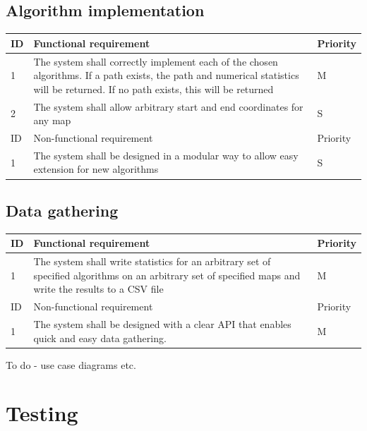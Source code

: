 \documentclass[12pt,twoside,notitlepage]{report}
\begin{document}
\subsection{Algorithm implementation}

\begin{center}
    \begin{tabular}{ l | p{10cm} | l}
    ID & Functional requirement & Priority  \\ \hline
    1 & The system shall correctly implement each of the chosen algorithms. If a path exists, the path and numerical statistics will be returned. If no path exists, this will be returned   & M \\ \hline
    2 & The system shall allow arbitrary start and end coordinates for any map & S \\ \hline
     \hline 
    ID & Non-functional requirement & Priority  \\ \hline
    1 & The system shall be designed in a modular way to allow easy extension for new algorithms & S \\
    \end{tabular}
\end{center}

\subsection{Data gathering}

\begin{center}
    \begin{tabular}{ l | p{10cm} | l}
    ID & Functional requirement & Priority  \\ \hline
    1 & The system shall write statistics for an arbitrary set of specified algorithms on an arbitrary set of specified maps and write the results to a CSV file & M \\ \hline
     \hline 
    ID & Non-functional requirement & Priority  \\ \hline
    1 & The system shall be designed with a clear API that enables quick and easy data gathering. & M \\
    \end{tabular}
\end{center}

\noindent
To do - use case diagrams etc.

\section {Testing}
\end{document}
